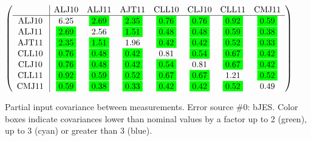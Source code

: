 \begin{table}[H]
\scriptsize
\begin{center}
\renewcommand{\arraystretch}{1.1}
\begin{math}\left(\begin{array}{c|ccccccc}
 & \mathrm{ALJ10} & 
\mathrm{ALJ11} & 
\mathrm{AJT11} & 
\mathrm{CLL10} & 
\mathrm{CLJ10} & 
\mathrm{CLL11} & 
\mathrm{CMJ11} \\
\hline
\mathrm{ALJ10} \hspace*{2pt} &       6.25 &  \colorbox{Green1}{$      2.69$} &  \colorbox{Green1}{$      2.35$} &  \colorbox{Green1}{$      0.76$} &  \colorbox{Green1}{$      0.76$} &  \colorbox{Green1}{$      0.92$} &  \colorbox{Green1}{$      0.59$} \\
\mathrm{ALJ11} \hspace*{2pt} &  \colorbox{Green1}{$      2.69$} &       2.56 &  \colorbox{Green1}{$      1.51$} &  \colorbox{Green1}{$      0.48$} &  \colorbox{Green1}{$      0.48$} &  \colorbox{Green1}{$      0.59$} &  \colorbox{Green1}{$      0.38$} \\
\mathrm{AJT11} \hspace*{2pt} &  \colorbox{Green1}{$      2.35$} &  \colorbox{Green1}{$      1.51$} &       1.96 &  \colorbox{Green1}{$      0.42$} &  \colorbox{Green1}{$      0.42$} &  \colorbox{Green1}{$      0.52$} &  \colorbox{Green1}{$      0.33$} \\
\mathrm{CLL10} \hspace*{2pt} &  \colorbox{Green1}{$      0.76$} &  \colorbox{Green1}{$      0.48$} &  \colorbox{Green1}{$      0.42$} &       0.81 &  \colorbox{Green1}{$      0.54$} &  \colorbox{Green1}{$      0.67$} &  \colorbox{Green1}{$      0.42$} \\
\mathrm{CLJ10} \hspace*{2pt} &  \colorbox{Green1}{$      0.76$} &  \colorbox{Green1}{$      0.48$} &  \colorbox{Green1}{$      0.42$} &  \colorbox{Green1}{$      0.54$} &       0.81 &  \colorbox{Green1}{$      0.67$} &  \colorbox{Green1}{$      0.42$} \\
\mathrm{CLL11} \hspace*{2pt} &  \colorbox{Green1}{$      0.92$} &  \colorbox{Green1}{$      0.59$} &  \colorbox{Green1}{$      0.52$} &  \colorbox{Green1}{$      0.67$} &  \colorbox{Green1}{$      0.67$} &       1.21 &  \colorbox{Green1}{$      0.52$} \\
\mathrm{CMJ11} \hspace*{2pt} &  \colorbox{Green1}{$      0.59$} &  \colorbox{Green1}{$      0.38$} &  \colorbox{Green1}{$      0.33$} &  \colorbox{Green1}{$      0.42$} &  \colorbox{Green1}{$      0.42$} &  \colorbox{Green1}{$      0.52$} &       0.49 \\
\end{array}\right)\end{math}
\caption{Partial input covariance between measurements. Error source \#0: bJES. Color boxes indicate covariances lower than nominal values by a factor up to 2 (green), up to 3 (cyan) or greater than 3 (blue).}
\renewcommand{\arraystretch}{1}
\end{center}
\end{table}
\clearpage
